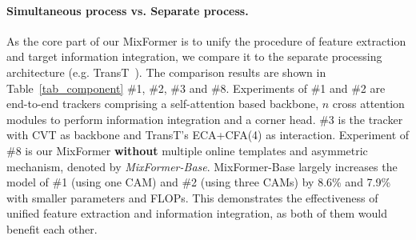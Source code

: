 \paragraph{Simultaneous process vs. Separate process.} 
As the core part of our MixFormer is to unify the procedure of feature extraction and target information integration, we compare it to the separate processing architecture (e.g. TransT~\cite{tt}). The comparison results are shown in Table~\ref{tab_component} \#1, \#2, \#3 and \#8. Experiments of \#1 and \#2 are end-to-end trackers comprising a self-attention based backbone, ${n}$ cross attention modules to perform information integration and a corner head. \#3 is the tracker with CVT as backbone and TransT's ECA+CFA(4) as interaction. Experiment of \#8 is our MixFormer {\bf without} multiple online templates and asymmetric mechanism, denoted by \emph{MixFormer-Base}. MixFormer-Base largely increases the model of \#1 (using one CAM) and \#2 (using three CAMs) by 8.6\% and 7.9\% with smaller parameters and FLOPs. This demonstrates the effectiveness of unified feature extraction and information integration, as both of them would benefit each other.
\vspace{-3mm}
\begin{table}[pt]
    \centering
    \fontsize{7.5}{8.5}\selectfont  
    \vspace{-1mm}
    \caption{Analysis of the MAM based framework. '-' denotes the component is not used. SAM represents for self attention module, CAM for cross attention module and MAM for the proposed mixed attention module. The numbers in brackets represent the number of the blocks. Performance is evaluated on LaSOT.}
    \label{tab_component}
\vspace{-6mm}
\end{table}

